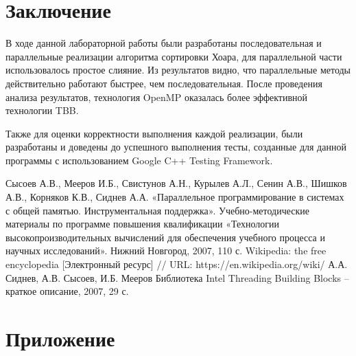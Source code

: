 \documentclass{report}
\begin{document}
\section*{Заключение}
В ходе данной лабораторной работы были разработаны последовательная и параллельные реализации алгоритма сортировки Хоара, для параллельной части использовалось простое слияние.
Из результатов видно, что параллельные методы действительно работают быстрее, чем последовательная.
После проведения анализа результатов, технология OpenMP оказалась более эффективной технологии TBB.
\par Также для оценки корректности выполнения каждой реализации, были разработаны и доведены до успешного выполнения тесты, созданные для данной программы с использованием Google C++ Testing Framework.

\newpage
\begin{thebibliography}{1}
 Сысоев А.В., Мееров И.Б., Свистунов А.Н., Курылев А.Л., Сенин А.В., Шишков А.В., Корняков К.В., Сиднев А.А. «Параллельное программирование в системах с общей памятью. Инструментальная поддержка». Учебно-методические материалы по программе повышения квалификации «Технологии высокопроизводительных вычислений для обеспечения учебного процесса и научных исследований». Нижний Новгород, 2007, 110 с. 
 Wikipedia: the free encyclopedia [Электронный ресурс] // URL: https://en.wikipedia.org/wiki/
 А.А. Сиднев, А.В. Сысоев, И.Б. Мееров Библиотека Intel Threading Building Blocks – краткое описание, 2007, 29 с. 
\end{thebibliography}
\newpage


\section*{Приложение}
\end{document}
